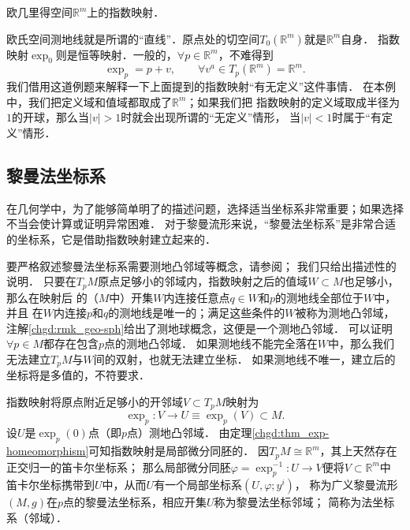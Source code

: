 \begin{example}
    欧几里得空间$\mathbb{R}^m$上的指数映射．
\end{example}
欧氏空间测地线就是所谓的“直线”．原点处的切空间$T_0(\mathbb{R}^m)$就是$\mathbb{R}^m$自身．
指数映射$\exp_{0}$则是恒等映射．一般的，$\forall p\in \mathbb{R}^m$，不难得到
\begin{equation}
    \exp_{p} = p + v, \qquad \forall v^a\in T_p(\mathbb{R}^m)=\mathbb{R}^m.
\end{equation}
我们借用这道例题来解释一下上面提到的指数映射“有无定义”这件事情．
在本例中，我们把定义域和值域都取成了$\mathbb{R}^m$；如果我们把
指数映射的定义域取成半径为$1$的开球，那么当$|v|>1$时就会出现所谓的“无定义”情形，
当$|v|<1$时属于“有定义”情形．





\subsection{黎曼法坐标系}\label{chgd:sec_RNC}
在几何学中，为了能够简单明了的描述问题，选择适当坐标系非常重要；如果选择不当会使计算或证明异常困难．
对于黎曼流形来说，“黎曼法坐标系”是非常合适的坐标系，它是借助指数映射建立起来的．

要严格叙述黎曼法坐标系需要测地凸邻域等概念，请参阅\parencite[\S 3.4-3.5]{chen-li-2023-2ed-v1}；
我们只给出描述性的说明．
只要在$T_pM$原点足够小的邻域内，指数映射之后的值域$W\subset M$也足够小，那么在映射后
的（$M$中）开集$W$内连接任意点$q\in W$和$p$的测地线全部位于$W$中，并且
在$W$内连接$p$和$q$的测地线是唯一的；满足这些条件的$W$被称为测地凸邻域，
注解\ref{chgd:rmk_geo-sph}给出了测地球概念，这便是一个测地凸邻域．
可以证明$\forall p \in M$都存在包含$p$点的测地凸邻域．
如果测地线不能完全落在$W$中，那么我们无法建立$T_pM$与$W$间的双射，也就无法建立坐标．
如果测地线不唯一，建立后的坐标将是多值的，不符要求．



指数映射将原点附近足够小的开邻域$V\subset T_pM$映射为
\begin{equation}
    \exp_{p} : V \to U \equiv\exp_{p}(V) \subset M .
\end{equation}
设$U$是$\exp_{p}(0)$点（即$p$点）测地凸邻域．
由定理\ref{chgd:thm_exp-homeomorphism}可知指数映射是局部微分同胚的．
因$T_pM \cong \mathbb{R}^m$，其上天然存在正交归一的笛卡尔坐标系；
那么局部微分同胚$\varphi = \exp_{p}^{-1}:U\to V$便将$V\subset \mathbb{R}^m$中
笛卡尔坐标携带到$U$中，从而$U$有一个局部坐标系$(U,\varphi;y^i)$，
称为广义黎曼流形$(M,g)$在$p$点的{\heiti 黎曼法坐标系}，相应开集$U$称为{\heiti 黎曼法坐标邻域}；
简称为{\heiti 法坐标系（邻域）}．

